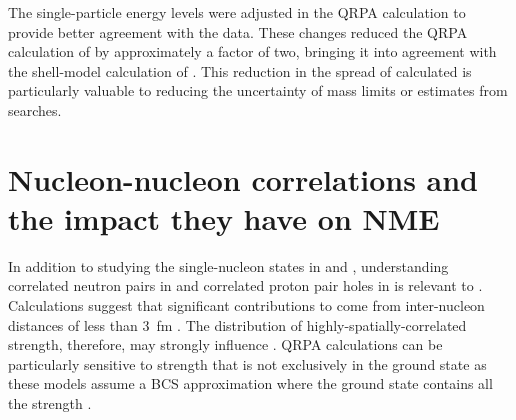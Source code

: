 The single-particle energy levels were adjusted in the QRPA calculation \citep{SuhonenEnergyAdjust} to provide better agreement with the data.  These changes reduced the QRPA calculation of \NME by approximately a factor of two, bringing it into agreement with the shell-model calculation of \NME.  This reduction in the spread of calculated \NME is particularly valuable to reducing the uncertainty of mass limits or estimates from \zvbb searches. 

\section{Nucleon-nucleon correlations and the impact they have on NME}
\label{sec:correlations}

In addition to studying the single-nucleon states in \GeTargets and \SeProducts, understanding correlated neutron pairs in  and correlated proton pair holes in  is relevant to \NME.  Calculations suggest that significant contributions to \NME come from inter-nucleon distances of less than 3~fm \citep{anatomy}.  The distribution of highly-spatially-correlated \zp strength, therefore, may strongly influence \NME.  QRPA calculations can be particularly sensitive to \zp strength that is not exclusively in the ground state as these models assume a BCS approximation where the ground state contains all the \zp strength \citep{BenderSCMF}. 

